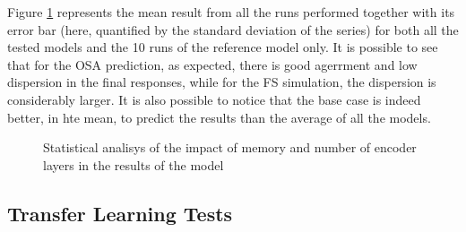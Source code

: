 \documentclass[conference]{IEEEtran}
\begin{document}
Figure \ref{fig:statistical_results} represents the mean result from all the runs performed together
with its error bar (here, quantified by the standard deviation of the series) for both all the tested models
and the 10 runs of the reference model only. It is possible to see that for the OSA prediction, as expected,
there is good agerrment and low dispersion in the final responses, while for the FS simulation, the dispersion
is considerably larger. It is also possible to notice that the base case is indeed better, in hte mean, to
predict the results than the average of all the models.

\begin{figure}[htbp]
    \centering
    \hfil
    \hfil
    \caption{Statistical analisys of the impact of memory and number of encoder layers in the results of the model}
    \label{fig:statistical_results}
\end{figure}

\subsection{Transfer Learning Tests}
\end{document}
